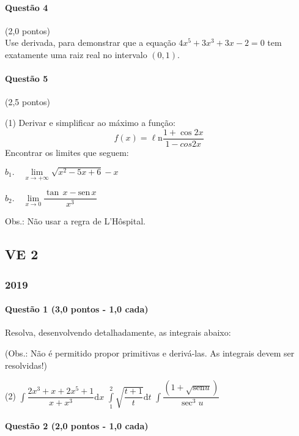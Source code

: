 \documentclass[12pt,a4paper]{article}
\newcommand{\sen}{\mathrm{sen}}
\newcommand{\dd}{\mathrm{d}}
\newcommand{\Ln}{\ell\mathrm{n}}
\begin{document}
\paragraph{Questão 4} (2,0 pontos)\\
Use derivada, para demonstrar que a equação $4x^5 +3x^3 + 3x - 2 = 0$ tem exatamente uma raiz real no intervalo $(0,1)$.

\paragraph{Questão 5} (2,5 pontos)\begin{tasks}(1)
\task Derivar e simplificar ao máximo a função:$$f(x) = \Ln \dfrac{1+\cos 2x}{1-cos 2x}$$\task Encontrar os limites que seguem:

$b_1. \quad \lim\limits_{x\to +\infty} \sqrt{x^2 - 5x + 6} - x$

$b_2. \quad \lim\limits_{x \to 0} \dfrac{\tan \, x - \sen \, x}{x^3}$
\end{tasks}

Obs.: Não usar a regra de L'Hôspital.
\newpage

\subsection{VE 2}

\subsubsection{2019}

\paragraph{Questão 1 (3,0 pontos - 1,0 cada)}

Resolva, desenvolvendo detalhadamente, as integrais abaixo:

(Obs.: Não é permitido propor primitivas e derivá-las. As integrais devem ser resolvidas!)

\begin{tasks}(2)
    \task $\displaystyle\int \dfrac{2x^3 + x +2x^5 + 1}{x + x^3} \dd x$
    \task $\displaystyle\int\limits_{1}^{2} \sqrt{\dfrac{t + 1}{t}} \dd t$
    \task $\displaystyle\int\dfrac{(1 +\sqrt{\sen{u}})}{\sec^{3}u}$

\end{tasks}


\paragraph{Questão 2 (2,0 pontos - 1,0 cada)}
\end{document}
